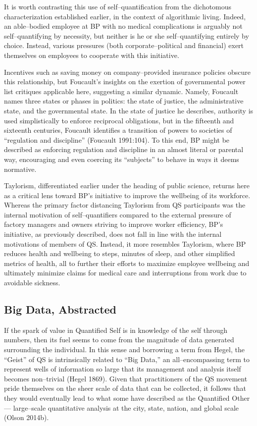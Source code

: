 \documentclass{article}
\begin{document}
It is worth contrasting this use of self--quantification from the dichotomous characterization established earlier,
in the context of algorithmic living.
Indeed,
an able--bodied employee at BP with no medical complications is arguably not self--quantifying by necessity,
but neither is he or she self--quantifying entirely by choice.
Instead,
various pressures (both corporate--political and financial) exert themselves on employees to cooperate with this initiative. 

Incentives such as saving money on company--provided insurance policies obscure this relationship,
but Foucault's insights on the exertion of governmental power list critiques applicable here,
suggesting a similar dynamic.
Namely,
Foucault names three states or phases in politics:
the state of justice,
the administrative state,
and the governmental state.
In the state of justice he describes,
authority is used simplistically to enforce reciprocal obligations,
but in the fifteenth and sixteenth centuries,
Foucault identifies a transition of powers to societies of ``regulation and discipline''
(Foucault 1991:104). 
To this end,
BP might be described as enforcing regulation and discipline in an almost literal or parental way,
encouraging and even coercing its ``subjects'' to behave in ways it deems normative.

Taylorism,
differentiated earlier under the heading of public science,
returns here as a critical lens toward BP's initiative to improve the wellbeing of its workforce.
Whereas the primary factor distancing Taylorism from QS participants was the internal motivation of self--quantifiers compared to the external pressure of factory managers and owners striving to improve worker efficiency,
BP's initiative,
as previously described,
does not fall in line with the internal motivations of members of QS.
Instead,
it more resembles Taylorism,
where BP reduces health and wellbeing to steps,
minutes of sleep,
and other simplified metrics of health,
all to further their efforts to maximize employee wellbeing and ultimately minimize claims for medical care and interruptions from work due to avoidable sickness.

\subsection*{Big Data, Abstracted}
If the spark of value in Quantified Self is in knowledge of the self through numbers,
then its fuel seems to come from the magnitude of data generated surrounding the individual.
In this sense and borrowing a term from Hegel,
the ``Geist'' of QS is intrinsically related to ``Big Data,'' an all--encompassing term to represent wells of information so large that its management and analysis itself becomes non--trivial
(Hegel 1869). 
Given that practitioners of the QS movement pride themselves on the sheer scale of data that can be collected,
it follows that they would eventually lead to what some have described as the Quantified Other
--- large--scale quantitative analysis at the city,
state,
nation,
and global scale
(Olson 2014b). 
\end{document}
